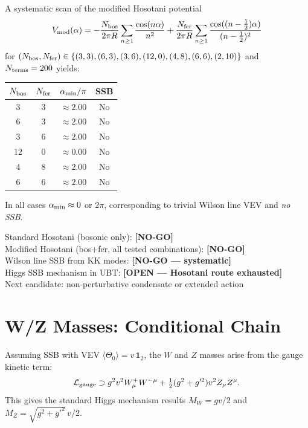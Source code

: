 \documentclass[12pt,a4paper]{article}
\begin{document}
A systematic scan of the modified Hosotani potential
\[
V_{\rm mod}(\alpha) = -\frac{N_{\rm bos}}{2\pi R}
  \sum_{n\geq1}\frac{\cos(n\alpha)}{n^2}
  + \frac{N_{\rm fer}}{2\pi R}
  \sum_{n\geq1}\frac{\cos((n-\tfrac12)\alpha)}{(n-\tfrac12)^2}
\]
for $(N_{\rm bos}, N_{\rm fer})\in
\{(3,3),(6,3),(3,6),(12,0),(4,8),(6,6),(2,10)\}$
and $N_{\rm terms}=200$ yields:

\begin{center}\begin{tabular}{cccc}
\toprule
$N_{\rm bos}$ & $N_{\rm fer}$ & $\alpha_{\rm min}/\pi$ & SSB \\
\midrule
3 & 3 & $\approx 2.00$ & No \\
6 & 3 & $\approx 2.00$ & No \\
3 & 6 & $\approx 2.00$ & No \\
12 & 0 & $\approx 0.00$ & No \\
4 & 8 & $\approx 2.00$ & No \\
6 & 6 & $\approx 2.00$ & No \\
\bottomrule
\end{tabular}\end{center}

In all cases $\alpha_{\rm min}\approx 0$ or $2\pi$, corresponding to
trivial Wilson line VEV and \emph{no SSB}.

\begin{statusbox}
Standard Hosotani (bosonic only): \textbf{[NO-GO]}\\
Modified Hosotani (bos+fer, all tested combinations): \textbf{[NO-GO]}\\
Wilson line SSB from KK modes: \textbf{[NO-GO — systematic]}\\
Higgs SSB mechanism in UBT: \textbf{[OPEN — Hosotani route exhausted]}\\
Next candidate: non-perturbative condensate or extended action
\end{statusbox}

\section{W/Z Masses: Conditional Chain}
\label{sec:wz_masses}

Assuming SSB with VEV $\langle\Theta_0\rangle = v\,\mathbf{1}_2$, the
$W$ and $Z$ masses arise from the gauge kinetic term:
\[
  \mathcal{L}_{\rm gauge} \supset
  g^2 v^2 W^+_\mu W^{-\mu} + \tfrac{1}{2}(g^2+g'^2)v^2 Z_\mu Z^\mu.
\]
This gives the standard Higgs mechanism results
$M_W = gv/2$ and $M_Z = \sqrt{g^2+g'^2}\,v/2$.
\end{document}
